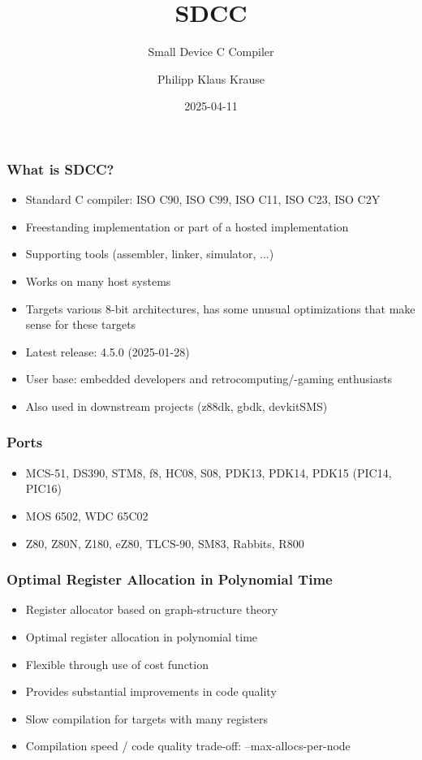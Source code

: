 \documentclass[xcolor=dvipsnames]{beamer}
\title{SDCC}
\subtitle{Small Device C Compiler}
\date{2025-04-11}
\author{Philipp Klaus Krause}
\begin{document}
\begin{frame}
	\titlepage
\end{frame}

\begin{frame}
	\frametitle{What is SDCC?}
	\begin{itemize}
		\item Standard C compiler: ISO C90, ISO C99, ISO C11, ISO C23, ISO C2Y
		\item Freestanding implementation or part of a hosted implementation
		\item Supporting tools (assembler, linker, simulator, ...)
		\item Works on many host systems
		\item Targets various 8-bit architectures, has some unusual optimizations that make sense for these targets
		\item Latest release: 4.5.0 (2025-01-28)
		\item User base: embedded developers and retrocomputing/-gaming enthusiasts
		\item Also used in downstream projects (z88dk, gbdk, devkitSMS)
	\end{itemize}
\end{frame}

\begin{frame}
	\frametitle{Ports}
	\begin{itemize}
		\item MCS-51, DS390, STM8, f8, HC08, S08, PDK13, PDK14, PDK15 (PIC14, PIC16)
		\item MOS 6502, WDC 65C02
		\item Z80, Z80N, Z180, eZ80, TLCS-90, SM83, Rabbits, R800
	\end{itemize}
\end{frame}

\begin{frame}
	\frametitle{Optimal Register Allocation in Polynomial Time}
	\begin{itemize}
		\item Register allocator based on graph-structure theory
		\item Optimal register allocation in polynomial time
		\item Flexible through use of cost function
		\item Provides substantial improvements in code quality
		\item Slow compilation for targets with many registers
		\item Compilation speed / code quality trade-off: --max-allocs-per-node
	\end{itemize}
\end{frame}
\end{document}
